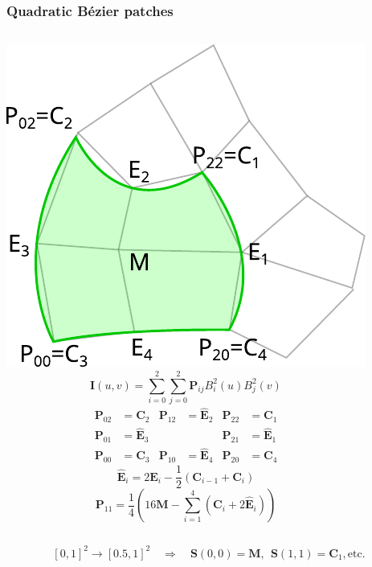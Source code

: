 \documentclass{beamer}
\begin{document}
\begin{frame}
  \frametitle{Quadratic B\'ezier patches}
  \begin{columns}   
    \centering
    \includegraphics[width=\textwidth]{images/qb.pdf}
    \[\mathbf{I}(u,v)=\sum_{i=0}^{2}\sum_{j=0}^{2}\mathbf{P}_{ij}B_{i}^{2}(u)B_{j}^{2}(v)\]
    \[\begin{aligned}
      \mathbf{P}_{02}&=\mathbf{C}_{2}&\mathbf{P}_{12}&=\hat{\mathbf{E}}_{2}&\mathbf{P}_{22}&=\mathbf{C}_{1}\\
      \mathbf{P}_{01}&=\hat{\mathbf{E}}_{3}&&&\mathbf{P}_{21}&=\hat{\mathbf{E}}_{1}\\
      \mathbf{P}_{00}&=\mathbf{C}_{3}&\mathbf{P}_{10}&=\hat{\mathbf{E}}_{4}&\mathbf{P}_{20}&=\mathbf{C}_{4}
    \end{aligned}\]
    \[\hat{\mathbf{E}}_{i}=2\mathbf{E}_{i}-\frac{1}{2}(\mathbf{C}_{i-1}+\mathbf{C}_{i})\]
    \[\mathbf{P}_{11}=\frac{1}{4}(16\mathbf{M}-\sum_{i=1}^{4}(\mathbf{C}_{i}+2\hat{\mathbf{E}}_{i}))\]
  \end{columns}
  \[[0,1]^2\rightarrow[0.5,1]^2\quad\Rightarrow\quad\mathbf{S}(0,0)=\mathbf{M},\ \ \mathbf{S}(1,1)=\mathbf{C}_{1},\text{etc.}\]
\end{frame}
\end{document}
